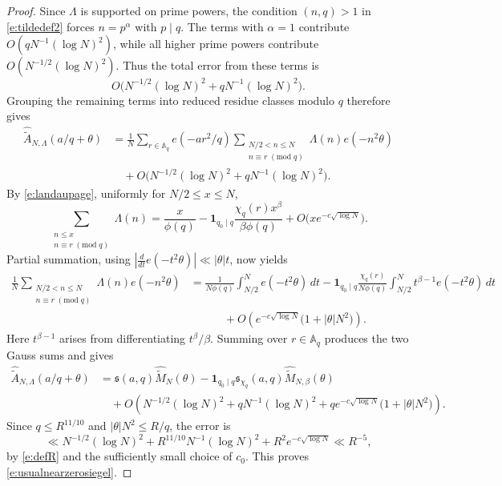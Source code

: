 \documentclass[12pt,reqno]{amsart}
\numberwithin{equation}{section}
\theoremstyle{definition}
\theoremstyle{remark}
\begin{document}
\begin{proof}
Since $\Lambda$ is supported on prime powers, the condition $(n,q)>1$ in \eqref{e:tildedef2}
forces $n=p^\alpha$ with $p\mid q$.  The terms with $\alpha=1$
contribute \(O(qN^{-1}(\log N)^2)\), while all higher prime powers
contribute \(O(N^{-1/2}(\log N)^2)\).  Thus the total error from these
terms is
\[
 O\bigl(N^{-1/2}(\log N)^2+qN^{-1}(\log N)^2\bigr).
\]
Grouping the remaining terms into reduced residue classes modulo \(q\)
therefore gives
\begin{align*}
 \widehat{\widetilde A}_{N,\Lambda}(a/q+\theta)
 &=
 \frac1N\sum_{r\in\mathbb A_q}e(-ar^2/q)
 \sum_{\substack{N/2<n\leq N\\n\equiv r\;(\mathrm{mod}\;q)}}
 \Lambda(n)e(-n^2\theta)\\
 &\quad+
 O\bigl(N^{-1/2}(\log N)^2+qN^{-1}(\log N)^2\bigr).
\end{align*}
By \eqref{e:landaupage}, uniformly for \(N/2\leq x\leq N\),
\[
 \sum_{\substack{n\leq x\\n\equiv r\;(\mathrm{mod}\;q)}}\Lambda(n)
 =
 \frac{x}{\phi(q)}
 -\mathbf1_{q_0\mid q}
 \frac{\chi_q(r)x^\beta}{\beta\phi(q)}
 +O\bigl(xe^{-c\sqrt{\log N}}\bigr).
\]
Partial summation, using
\(
 |\frac{d}{dt}e(-t^2\theta)|\ll|\theta|t
\),
now yields
\begin{align*}
 \frac1N
 \sum_{\substack{N/2<n\leq N\\n\equiv r\;(\mathrm{mod}\;q)}}
 \Lambda(n)e(-n^2\theta)&=
 \frac1{N\phi(q)}\int_{N/2}^{N}e(-t^2\theta)\,dt
 -\mathbf1_{q_0\mid q}
 \frac{\chi_q(r)}{N\phi(q)}
 \int_{N/2}^{N}t^{\beta-1}e(-t^2\theta)\,dt\\
 &\qquad\quad+
 O\left(e^{-c\sqrt{\log N}}
 \bigl(1+|\theta|N^2\bigr)\right).
\end{align*}
Here \(t^{\beta-1}\) arises from differentiating \(t^\beta/\beta\).
Summing over \(r\in\mathbb A_q\) produces the two Gauss sums and gives
\begin{align*}
 \widehat{\widetilde A}_{N,\Lambda}(a/q+\theta)
 &=
 \mathfrak s(a,q)\widehat{\widetilde M}_N(\theta)
 -\mathbf1_{q_0\mid q}\mathfrak s_{\chi_q}(a,q)
  \widehat{\widetilde M}_{N,\beta}(\theta)\\
 &\quad+
 O\left(
 N^{-1/2}(\log N)^2+qN^{-1}(\log N)^2
 +qe^{-c\sqrt{\log N}}\bigl(1+|\theta|N^2\bigr)
 \right).
\end{align*}
Since \(q\leq R^{11/10}\) and
\(|\theta|N^2\leq R/q\), the error is
\[
 \ll N^{-1/2}(\log N)^2
 +R^{11/10}N^{-1}(\log N)^2
 +R^2e^{-c\sqrt{\log N}}
 \ll R^{-5},
\]
by \eqref{e:defR} and the sufficiently small choice of \(c_0\).
This proves \eqref{e:usualnearzerosiegel}.


\end{proof}
\end{document}
